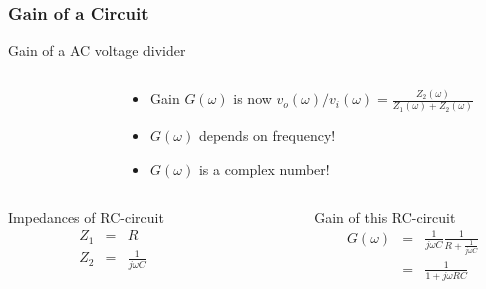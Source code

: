 \documentclass[beamer]{standalone}
\begin{document}
\begin{frame}[t]
 \frametitle{Gain of a Circuit}
 \begin{block}{Gain of a AC voltage divider}
  \begin{columns}
   \begin{column}{0.0\textwidth}
   \end{column}
   \begin{column}{0.5\textwidth}
   \end{column}
   \begin{column}{0.5\textwidth}
    \begin{itemize}
     \item Gain $G(\omega)$ is now $v_o(\omega) / v_i(\omega) = \frac{Z_2(\omega)}{Z_1(\omega) + Z_2(\omega)}$
     \item $G(\omega)$ depends on frequency!
     \item $G(\omega)$ is a complex number!
    \end{itemize}
   \end{column}
  \end{columns}
 \end{block}
 \begin{columns}[t]
  \begin{column}{0.5\textwidth}
   \begin{block}{Impedances of RC-circuit}
    \begin{eqnarray*}
     Z_1 & = & R \\
     Z_2 & = & \frac{1}{j\omega C}
    \end{eqnarray*}
   \end{block}
  \end{column}
  \begin{column}{0.0\textwidth}
  \end{column}
  \begin{column}{0.5\textwidth}
   \begin{block}{Gain of this RC-circuit}
    \begin{eqnarray*}
     G(\omega) & = & \frac{1}{j\omega C} \frac{1}{R +\frac{1}{j\omega C}} \\
               & = & \frac{1}{1 + j\omega R C}
    \end{eqnarray*}
   \end{block}
  \end{column}
 \end{columns}
\end{frame}
\end{document}
